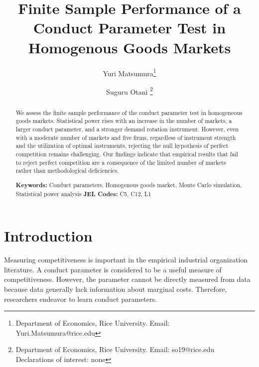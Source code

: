 \documentclass[11pt, a4paper]{article}
\title{Finite Sample Performance of a Conduct Parameter Test in Homogenous Goods Markets}
\author{Yuri Matsumura\thanks{Department of Economics, Rice University. Email: Yuri.Matsumura@rice.edu} \and Suguru Otani \thanks{Department of Economics, Rice University. Email: so19@rice.edu\\
Declarations of interest: none %
}}
\begin{document}
\maketitle
\begin{abstract}
    We assess the finite sample performance of the conduct parameter test in homogeneous goods markets. Statistical power rises with an increase in the number of markets, a larger conduct parameter, and a stronger demand rotation instrument. However, even with a moderate number of markets and five firms, regardless of instrument strength and the utilization of optimal instruments, rejecting the null hypothesis of perfect competition remains challenging. Our findings indicate that empirical results that fail to reject perfect competition are a consequence of the limited number of markets rather than methodological deficiencies.
\vspace{0.1in}

\noindent\textbf{Keywords:} Conduct parameters, Homogenous goods market, Monte Carlo simulation, Statistical power analysis
\vspace{0in}
\newline
\noindent\textbf{JEL Codes:} C5, C12, L1

\bigskip
\end{abstract}


\section{Introduction}
Measuring competitiveness is important in the empirical industrial organization literature.
A conduct parameter is considered to be a useful measure of competitiveness. 
However, the parameter cannot be directly measured from data because data generally lack information about marginal costs.
Therefore, researchers endeavor to learn conduct parameters.
\end{document}
